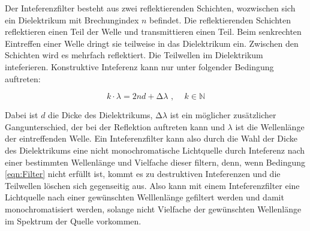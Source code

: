 Der Inteferenzfilter besteht aus zwei reflektierenden Schichten, wozwischen sich ein Dielektrikum mit Brechungindex $n$ befindet. Die reflektierenden Schichten reflektieren einen Teil der Welle und transmittieren einen Teil. Beim senkrechten Eintreffen einer Welle dringt sie teilweise in das Dielektrikum ein. Zwischen den Schichten wird es mehrfach reflektiert. Die Teilwellen im Dielektrikum inteferieren. Konstruktive Inteferenz kann nur unter folgender Bedingung auftreten:

\begin{equation}
    k \cdot \lambda = 2 n d + \increment \lambda \, \, , \, \, \, \, \, \, \, k \in \mathbb{N}
    \label{eqn:Filter}
\end{equation}

Dabei ist $d$ die Dicke des Dielektrikums, $\increment \lambda$ ist ein möglicher zusätzlicher Gangunterschied, der bei der Reflektion auftreten kann und $\lambda$ ist die Wellenlänge der eintreffenden Welle. Ein Inteferenzfilter kann also durch die Wahl der Dicke des Dielektrikums eine nicht monochromatische Lichtquelle durch Inteferenz nach einer bestimmten Wellenlänge und Vielfache dieser filtern, denn, wenn Bedingung \eqref{eqn:Filter} nicht erfüllt ist, kommt es zu destruktiven Inteferenzen und die Teilwellen löschen sich gegenseitig aus. Also kann mit einem Inteferenzfilter eine Lichtquelle nach einer gewünschten Welllenlänge gefiltert werden und damit monochromatisiert werden, solange nicht Vielfache der gewünschten Wellenlänge im Spektrum der Quelle vorkommen.
